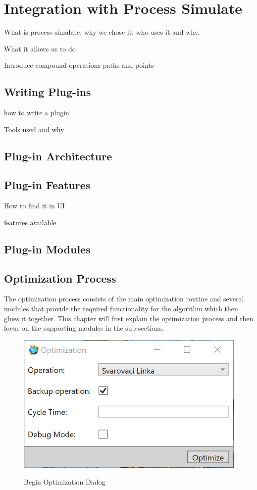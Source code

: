 \chapter{Integration with Process Simulate}
\label{ch:integration}
\graphicspath{{chapters/Integration/}}

What is process simulate, why we chose it, who uses it and why.

What it allows us to do

Introduce compound operations paths and points

\section{Writing Plug-ins}

how to write a plugin

Tools used and why

\section{Plug-in Architecture}

\section{Plug-in Features}
How to find it in UI

features available

\section{Plug-in Modules}

\section{Optimization Process}

The optimization process consists of the main optimization routine and several modules that provide the required functionality for the algorithm which then glues it together. This chapter will first explain the optimization process and then focus on the supporting modules in the sub-sections. \\

\begin{figure}[ht]
	\caption{Begin Optimization Dialog}
	\centering
	\includegraphics[width=\textwidth]{dialog_beginoptimization}
	\label{fig:DialogBeginOptimization}
\end{figure}

